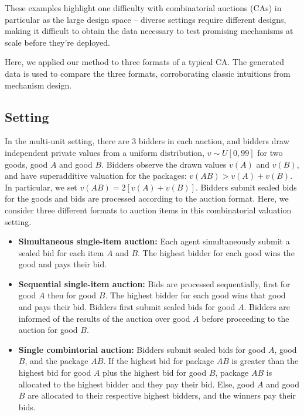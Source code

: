 \documentclass{article} %
\begin{document}
These examples highlight one difficulty with combinatorial auctions (CAs) in particular as the large design space -- diverse settings require different designs, making it difficult to obtain the data necessary to test promising mechanisms at scale before they're deployed.

Here, we applied our method to three formats of a typical CA. 
The generated data is used to compare the three formats, corroborating classic intuitions from mechanism design.

\subsection{Setting} In the multi-unit setting, there are 3 bidders in each auction, and bidders draw independent private values from a uniform distribution, $v \sim U[0, 99]$ for two goods, good $A$ and good $B$. 
Bidders observe the drawn values $v(A)$ and $v(B)$, and have superadditive valuation for the packages: $v(AB) > v(A) + v(B)$. 
In particular, we set $v(AB) = 2[v(A) + v(B)]$.
Bidders submit sealed bids for the goods and bids are processed according to the auction format. 
Here, we consider three different formats to auction items in this combinatorial valuation setting.
\begin{itemize}
    \item \textbf{Simultaneous single-item auction:} Each agent simultaneously submit a sealed bid for each item $A$ and $B$. The highest bidder for each good wins the good and pays their bid. \vspace{1mm}
    
    \item \textbf{Sequential single-item auction:} Bids are processed sequentially, first for good $A$ then for good $B$. The highest bidder for each good wins that good and pays their bid. Bidders first submit sealed bids for good $A$. Bidders are informed of the results of the auction over good $A$ before proceeding to the auction for good $B$. \vspace{1mm}
    
    \item \textbf{Single combintorial auction:} Bidders submit sealed bids for good $A$, good $B$, and the package $AB$. If the highest bid for package $AB$ is greater than the highest bid for good $A$ plus the highest bid for good $B$, package $AB$ is allocated to the highest bidder and they pay their bid. Else, good $A$ and good $B$ are allocated to their respective highest bidders, and the winners pay their bids. 
\end{itemize}
\end{document}

